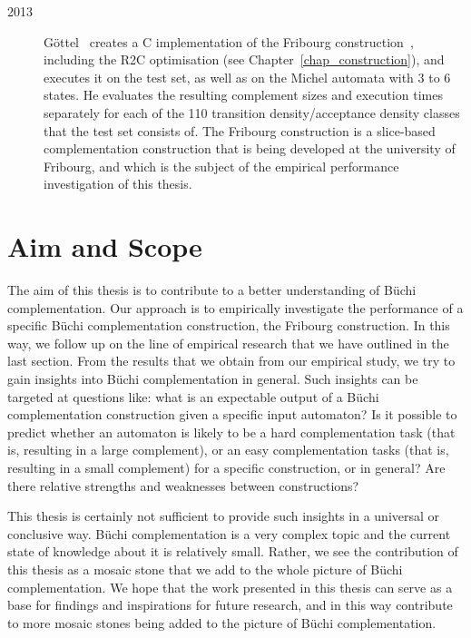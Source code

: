 {\begin{description}
\item[2013] Göttel~\cite{2013_bsc_goettel} creates a C implementation of the Fribourg construction~\cite{2014_joel_ulrich}, including the R2C optimisation (see Chapter~\ref{chap_construction}), and executes it on the \goal{} test set, as well as on the Michel automata with 3 to 6 states. He evaluates the resulting complement sizes and execution times separately for each of the 110 transition density/acceptance density classes that the \goal{} test set consists of. The Fribourg construction is a slice-based complementation construction that is being developed at the university of Fribourg, and which is the subject of the empirical performance investigation of this thesis.
\end{description}}


\section{Aim and Scope}
\label{1_aim_scope}
The aim of this thesis is to contribute to a better understanding of Büchi complementation. Our approach is to empirically investigate the performance of a specific Büchi complementation construction, the Fribourg construction. In this way, we follow up on the line of empirical research that we have outlined in the last section. From the results that we obtain from our empirical study, we try to gain insights into Büchi complementation in general. Such insights can be targeted at questions like: what is an expectable output of a Büchi complementation construction given a specific input automaton? Is it possible to predict whether an automaton is likely to be a hard complementation task (that is, resulting in a large complement), or an easy complementation tasks (that is, resulting in a small complement) for a specific construction, or in general? Are there relative strengths and weaknesses between constructions?

This thesis is certainly not sufficient to provide such insights in a universal or conclusive way. Büchi complementation is a very complex topic and the current state of knowledge about it is relatively small. Rather, we see the contribution of this thesis as a mosaic stone that we add to the whole picture of Büchi complementation. We hope that the work presented in this thesis can serve as a base for findings and inspirations for future research, and in this way contribute to more mosaic stones being added to the picture of Büchi complementation.



